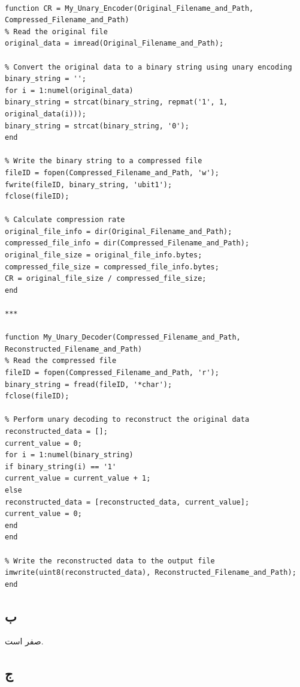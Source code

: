\documentclass{article}
\begin{document}
\begin{latin}
\begin{verbatim}

function CR = My_Unary_Encoder(Original_Filename_and_Path, Compressed_Filename_and_Path)
% Read the original file
original_data = imread(Original_Filename_and_Path);

% Convert the original data to a binary string using unary encoding
binary_string = '';
for i = 1:numel(original_data)
binary_string = strcat(binary_string, repmat('1', 1, original_data(i)));
binary_string = strcat(binary_string, '0');
end

% Write the binary string to a compressed file
fileID = fopen(Compressed_Filename_and_Path, 'w');
fwrite(fileID, binary_string, 'ubit1');
fclose(fileID);

% Calculate compression rate
original_file_info = dir(Original_Filename_and_Path);
compressed_file_info = dir(Compressed_Filename_and_Path);
original_file_size = original_file_info.bytes;
compressed_file_size = compressed_file_info.bytes;
CR = original_file_size / compressed_file_size;
end

***

function My_Unary_Decoder(Compressed_Filename_and_Path, Reconstructed_Filename_and_Path)
% Read the compressed file
fileID = fopen(Compressed_Filename_and_Path, 'r');
binary_string = fread(fileID, '*char');
fclose(fileID);

% Perform unary decoding to reconstruct the original data
reconstructed_data = [];
current_value = 0;
for i = 1:numel(binary_string)
if binary_string(i) == '1'
current_value = current_value + 1;
else
reconstructed_data = [reconstructed_data, current_value];
current_value = 0;
end
end

% Write the reconstructed data to the output file
imwrite(uint8(reconstructed_data), Reconstructed_Filename_and_Path);
end

\end{verbatim}
\end{latin}
	
	
	\subsection{ب}
	صفر است.
	
	\subsection{ج}
	
\end{document}
